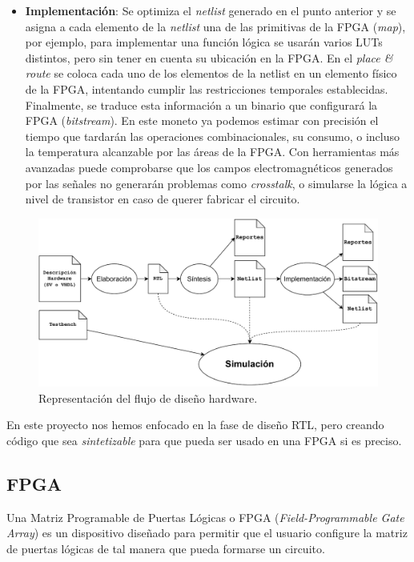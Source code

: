 \begin{itemize}
    \item \textbf{Implementación}: Se optimiza el \textit{netlist} generado en el punto anterior y se asigna a cada elemento de la \textit{netlist} una de las primitivas de la FPGA (\textit{map}), por ejemplo, para implementar una función lógica se usarán varios LUTs distintos, pero sin tener en cuenta su ubicación en la FPGA. En el \textit{place \& route} se coloca cada uno de los elementos de la netlist en un elemento físico de la FPGA, intentando cumplir las restricciones temporales establecidas. Finalmente, se traduce esta información a un binario que configurará la FPGA (\textit{bitstream}). En este moneto ya podemos estimar con precisión el tiempo que tardarán las operaciones combinacionales, su consumo, o incluso la temperatura alcanzable por las áreas de la FPGA. Con herramientas más avanzadas puede comprobarse que los campos electromagnéticos generados por las señales no generarán problemas como \textit{crosstalk}, o simularse la lógica a nivel de transistor en caso de querer fabricar el circuito.
\end{itemize}

\begin{figure}[h]
    \centering
    \includegraphics[width=\textwidth]{images/diagrams/design_flow.drawio.pdf}
    \caption{Representación del flujo de diseño hardware.}
    \label{fig:diagram_design_flow}
\end{figure}

En este proyecto nos hemos enfocado en la fase de diseño RTL, pero creando código que sea \textit{sintetizable} para que pueda ser usado en una FPGA si es preciso.

\subsection{FPGA}
Una Matriz Programable de Puertas Lógicas o FPGA (\textit{Field-Programmable Gate Array}) es un dispositivo diseñado para permitir que el usuario configure la matriz de puertas lógicas de tal manera que pueda formarse un circuito.

